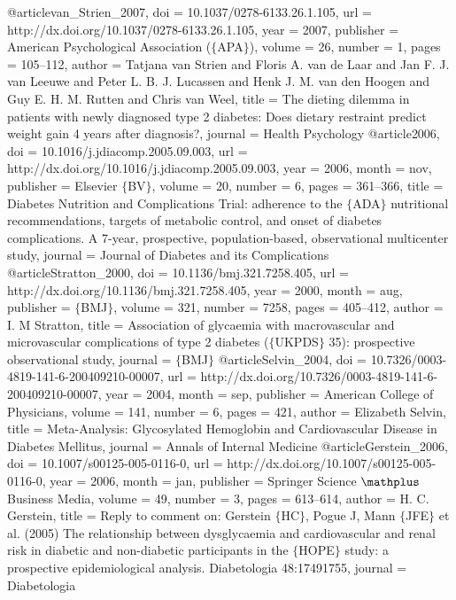 @article{van_Strien_2007,
	doi = {10.1037/0278-6133.26.1.105},
	url = {http://dx.doi.org/10.1037/0278-6133.26.1.105},
	year = 2007,
	publisher = {American Psychological Association ($\lbrace$APA$\rbrace$)},
	volume = {26},
	number = {1},
	pages = {105--112},
	author = {Tatjana van Strien and Floris A. van de Laar and Jan F. J. van Leeuwe and Peter L. B. J. Lucassen and Henk J. M. van den Hoogen and Guy E. H. M. Rutten and Chris van Weel},
	title = {The dieting dilemma in patients with newly diagnosed type 2 diabetes: Does dietary restraint predict weight gain 4 years after diagnosis?},
	journal = {Health Psychology}
}
@article{2006,
	doi = {10.1016/j.jdiacomp.2005.09.003},
	url = {http://dx.doi.org/10.1016/j.jdiacomp.2005.09.003},
	year = 2006,
	month = {nov},
	publisher = {Elsevier $\lbrace$BV$\rbrace$},
	volume = {20},
	number = {6},
	pages = {361--366},
	title = {Diabetes Nutrition and Complications Trial: adherence to the $\lbrace$ADA$\rbrace$ nutritional recommendations, targets of metabolic control, and onset of diabetes complications. A 7-year, prospective, population-based, observational multicenter study},
	journal = {Journal of Diabetes and its Complications}
}
@article{Stratton_2000,
	doi = {10.1136/bmj.321.7258.405},
	url = {http://dx.doi.org/10.1136/bmj.321.7258.405},
	year = 2000,
	month = {aug},
	publisher = {$\lbrace$BMJ$\rbrace$},
	volume = {321},
	number = {7258},
	pages = {405--412},
	author = {I. M Stratton},
	title = {Association of glycaemia with macrovascular and microvascular complications of type 2 diabetes ($\lbrace$UKPDS$\rbrace$ 35): prospective observational study},
	journal = {$\lbrace$BMJ$\rbrace$}
}
@article{Selvin_2004,
	doi = {10.7326/0003-4819-141-6-200409210-00007},
	url = {http://dx.doi.org/10.7326/0003-4819-141-6-200409210-00007},
	year = 2004,
	month = {sep},
	publisher = {American College of Physicians},
	volume = {141},
	number = {6},
	pages = {421},
	author = {Elizabeth Selvin},
	title = {Meta-Analysis: Glycosylated Hemoglobin and Cardiovascular Disease in Diabetes Mellitus},
	journal = {Annals of Internal Medicine}
}
@article{Gerstein_2006,
	doi = {10.1007/s00125-005-0116-0},
	url = {http://dx.doi.org/10.1007/s00125-005-0116-0},
	year = 2006,
	month = {jan},
	publisher = {Springer Science $\mathplus$ Business Media},
	volume = {49},
	number = {3},
	pages = {613--614},
	author = {H. C. Gerstein},
	title = {Reply to comment on: Gerstein $\lbrace$HC$\rbrace$, Pogue J, Mann $\lbrace$JFE$\rbrace$ et al. (2005) The relationship between dysglycaemia and cardiovascular and renal risk in diabetic and non-diabetic participants in the $\lbrace$HOPE$\rbrace$ study: a prospective epidemiological analysis. Diabetologia 48:1749{\textendash}1755},
	journal = {Diabetologia}
}
